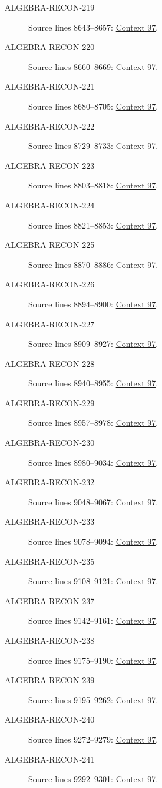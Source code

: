 \begin{description}
\item[ALGEBRA-RECON-219] Source lines 8643--8657: \hyperlink{algebra-context-097}{Context 97}.
\item[ALGEBRA-RECON-220] Source lines 8660--8669: \hyperlink{algebra-context-097}{Context 97}.
\item[ALGEBRA-RECON-221] Source lines 8680--8705: \hyperlink{algebra-context-097}{Context 97}.
\item[ALGEBRA-RECON-222] Source lines 8729--8733: \hyperlink{algebra-context-097}{Context 97}.
\item[ALGEBRA-RECON-223] Source lines 8803--8818: \hyperlink{algebra-context-097}{Context 97}.
\item[ALGEBRA-RECON-224] Source lines 8821--8853: \hyperlink{algebra-context-097}{Context 97}.
\item[ALGEBRA-RECON-225] Source lines 8870--8886: \hyperlink{algebra-context-097}{Context 97}.
\item[ALGEBRA-RECON-226] Source lines 8894--8900: \hyperlink{algebra-context-097}{Context 97}.
\item[ALGEBRA-RECON-227] Source lines 8909--8927: \hyperlink{algebra-context-097}{Context 97}.
\item[ALGEBRA-RECON-228] Source lines 8940--8955: \hyperlink{algebra-context-097}{Context 97}.
\item[ALGEBRA-RECON-229] Source lines 8957--8978: \hyperlink{algebra-context-097}{Context 97}.
\item[ALGEBRA-RECON-230] Source lines 8980--9034: \hyperlink{algebra-context-097}{Context 97}.
\item[ALGEBRA-RECON-232] Source lines 9048--9067: \hyperlink{algebra-context-097}{Context 97}.
\item[ALGEBRA-RECON-233] Source lines 9078--9094: \hyperlink{algebra-context-097}{Context 97}.
\item[ALGEBRA-RECON-235] Source lines 9108--9121: \hyperlink{algebra-context-097}{Context 97}.
\item[ALGEBRA-RECON-237] Source lines 9142--9161: \hyperlink{algebra-context-097}{Context 97}.
\item[ALGEBRA-RECON-238] Source lines 9175--9190: \hyperlink{algebra-context-097}{Context 97}.
\item[ALGEBRA-RECON-239] Source lines 9195--9262: \hyperlink{algebra-context-097}{Context 97}.
\item[ALGEBRA-RECON-240] Source lines 9272--9279: \hyperlink{algebra-context-097}{Context 97}.
\item[ALGEBRA-RECON-241] Source lines 9292--9301: \hyperlink{algebra-context-097}{Context 97}.
\end{description}

